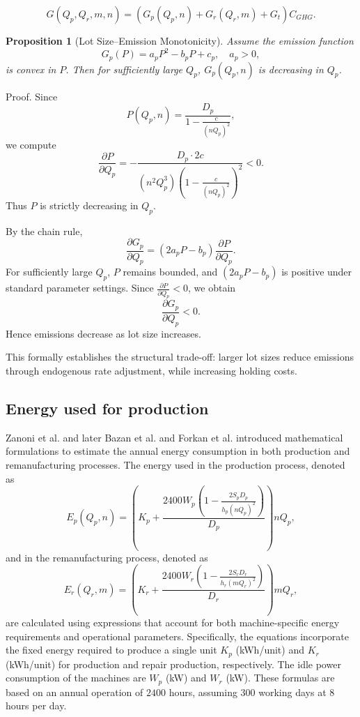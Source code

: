 \documentclass[11pt]{article}
\newtheorem{proposition}{Proposition}[section]
\newcommand{\proofbox}{\hspace{\fill}{$\Box$}}
\newenvironment{proof}{Proof.}{\proofbox}
\begin{document}
\begin{equation}
    G(Q_p, Q_r, m , n)= \left(G_p(Q_p, n)+G_r(Q_r, m)+G_t \right)C_{GHG}.
\end{equation}


\begin{proposition}[Lot Size–Emission Monotonicity]
Assume the emission function
\[
G_p(P) = a_pP^2 - b_pP + c_p,
\quad a_p>0,
\]
is convex in $P$. Then for sufficiently large $Q_p$,
$G_p(Q_p,n)$ is decreasing in $Q_p$.
\end{proposition}

\begin{proof}
Since
\[
P(Q_p,n)
= \frac{D_p}{1 - \frac{c}{(nQ_p)^2}},
\]
we compute
\[
\frac{\partial P}{\partial Q_p}
= -\frac{D_p \cdot 2c}{(n^2Q_p^3)\left(1 - \frac{c}{(nQ_p)^2}\right)^2} < 0.
\]
Thus $P$ is strictly decreasing in $Q_p$.

By the chain rule,
\[
\frac{\partial G_p}{\partial Q_p}
= (2a_pP - b_p)\frac{\partial P}{\partial Q_p}.
\]
For sufficiently large $Q_p$, $P$ remains bounded,
and $(2a_pP - b_p)$ is positive under standard parameter settings.
Since $\frac{\partial P}{\partial Q_p}<0$,
we obtain
\[
\frac{\partial G_p}{\partial Q_p} < 0.
\]
Hence emissions decrease as lot size increases.
\end{proof}

\medskip

\noindent This formally establishes the structural trade-off:
larger lot sizes reduce emissions through endogenous rate adjustment,
while increasing holding costs.

\subsection{Energy used for production}


Zanoni et al. \cite{Zanoni2014} and later Bazan et al. \cite{Bazan2015, Bazan2016} and Forkan et al. \cite{Forkan2022} introduced mathematical formulations to estimate the annual energy consumption in both production and remanufacturing processes. The energy used in the production process, denoted as 
$$
E_p(Q_p, n) = \left(K_p + \frac{2400W_p\left(1 - \frac{2S_pD_p}{h_p(nQ_p)^2}\right)}{D_p}\right)nQ_p,
$$ 
and in the remanufacturing process, denoted as 
$$
E_r(Q_r, m) = \left(K_r + \frac{2400W_r\left(1 - \frac{2S_rD_r}{h_r(mQ_r)^2}\right)}{D_r}\right)mQ_r,
$$
are calculated using expressions that account for both machine-specific energy requirements and operational parameters. Specifically, the equations incorporate the fixed energy required to produce a single unit $K_p$ (kWh/unit) and $K_r$ (kWh/unit) for production and repair production, respectively. The idle power consumption of the machines are $W_p$ (kW) and $W_r$ (kW).  These formulas are based on an annual operation of $2400$ hours, assuming $300$ working days at $8$ hours per day. 
\end{document}
